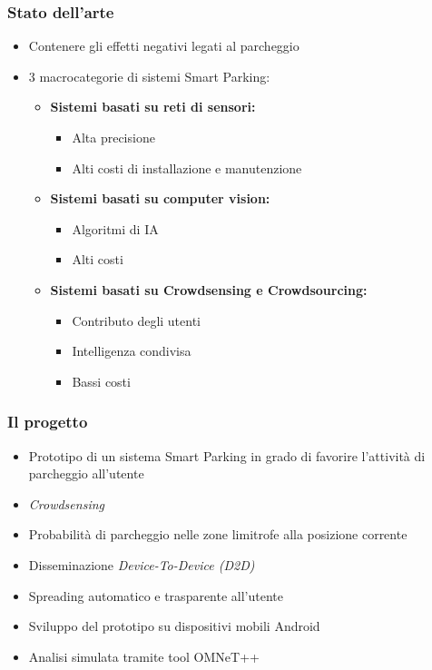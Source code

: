 \documentclass{beamer}
\begin{document}
\begin{frame}
  \frametitle{Stato dell'arte}
  \begin{itemize}

   \item Contenere gli effetti negativi legati al parcheggio
   \item 3 macrocategorie di sistemi Smart Parking: 

    \begin{itemize}
      \item \textbf{Sistemi basati su reti di sensori:}
      \begin{itemize}
	\item Alta precisione
	\item Alti costi di installazione e manutenzione
      \end{itemize}
      \item \textbf{Sistemi basati su computer vision:}
      \begin{itemize}
	\item Algoritmi di IA
	\item Alti costi
      \end{itemize}
      \item \textbf{Sistemi basati su Crowdsensing e Crowdsourcing:}
      \begin{itemize}
	\item Contributo degli utenti
	\item Intelligenza condivisa
	\item Bassi costi
      \end{itemize}
    \end{itemize}
  \end{itemize}
\end{frame}


\begin{frame}
  \frametitle{Il progetto}
  \begin{itemize}
    \item Prototipo di un sistema Smart Parking in grado di favorire l'attività di parcheggio all'utente 
    \item \textit{Crowdsensing}
    \item Probabilità di parcheggio nelle zone limitrofe alla posizione corrente
    \item Disseminazione \textit{Device-To-Device (D2D)}
    \item Spreading automatico e trasparente all'utente
    \item Sviluppo del prototipo su dispositivi mobili Android
    \item Analisi simulata tramite tool OMNeT++
  \end{itemize}
\end{frame}
\end{document}

